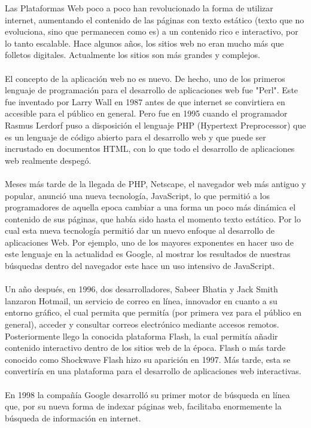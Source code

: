\begin{large}
Las Plataformas Web poco a poco han revolucionado la forma de utilizar internet, aumentando el contenido de las páginas con texto estático (texto que no evoluciona, sino que permanecen como es) a un contenido rico e interactivo, por lo tanto escalable. Hace algunos años, los sitios web no eran mucho más que folletos digitales. Actualmente los sitios son más grandes y complejos.
\\
\\
El concepto de la aplicación web no es nuevo. De hecho, uno de los primeros lenguaje de programación para el desarrollo de aplicaciones web fue "Perl".  Este fue inventado por Larry Wall en 1987 antes de que internet se convirtiera en accesible para el público en general. Pero fue en 1995 cuando el programador Rasmus Lerdorf puso a disposición el lenguaje PHP (Hypertext Preprocessor) que es un lenguaje de código abierto para el desarrollo web y que puede ser incrustado en documentos HTML, con lo que todo el desarrollo de aplicaciones web realmente despegó.
\\
\\
Meses más tarde de la llegada de PHP, Netscape, el navegador web más antiguo y popular, anunció una nueva tecnología, JavaScript, lo que permitió a los programadores de aquella epoca cambiar a una forma un poco más dinámica el contenido de sus páginas, que había sido hasta el momento texto estático. 
Por lo cual esta nueva tecnología permitió dar un nuevo enfoque al desarrollo de aplicaciones Web. Por ejemplo, uno de los mayores exponentes en hacer uso de este lenguaje en la actualidad es Google, al mostrar los resultados de nuestras búsquedas dentro del navegador este hace un uso intensivo de JavaScript. 
\\
\\
Un año después, en 1996, dos desarrolladores, Sabeer Bhatia y Jack Smith lanzaron Hotmail, un servicio de correo en línea, innovador en cuanto a su entorno gráfico, el cual permita que permitía (por primera vez para el público en general), acceder y consultar correos electrónico mediante accesos remotos.
\\
Posteriormente llego la conocida plataforma Flash,  la cual permitía  añadir contenido interactivo dentro de los sitios web de la época. Flash o más tarde conocido como Shockwave Flash hizo su aparición en 1997. Más tarde, esta se convertiría en una plataforma para el desarrollo de aplicaciones web interactivas.
\\
\\
En 1998 la compañía Google desarrolló su primer motor de búsqueda en línea que, por su nueva forma de indexar páginas web, facilitaba enormemente la búsqueda de información en internet. 

\end{large}
